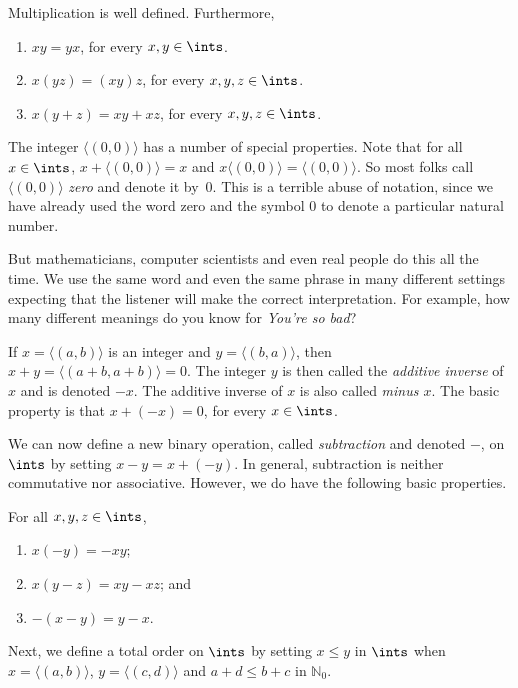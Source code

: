 \begin{theorem}  Multiplication is well defined.  Furthermore,
\begin{enumerate}
\item $xy=yx$,  for every $x,y\in \ints$.
\item $x(yz)=(xy)z$, for every $x,y,z\in \ints$.
\item $x(y+z)=xy+xz$, for every $x,y,z\in \ints$.
\end{enumerate}
\end{theorem}

The integer $\langle(0,0)\rangle$ has a number of special properties. 
Note that for all $x\in\ints$, $x+\langle(0,0)\rangle= x$ 
and $x\langle(0,0)\rangle=\langle(0,0)\rangle$.
So most folks call $\langle(0,0)\rangle$ \textit{zero}
and denote it by~$0$.  This is a terrible abuse of notation, 
since we have already used the word zero and the symbol $0$ to 
denote a particular natural number.

But mathematicians, computer scientists and even
real people do this all the time.  We use the same
word and even the same phrase in many different settings 
expecting that the listener
will make the correct interpretation.  For example, how many
different meanings do you know for \textit{You're so bad}?


If $x=\langle(a,b)\rangle$ is an integer and $y=
\langle(b,a)\rangle$, 
then $x+y=\langle(a+b,a+b)\rangle=0$.  
The integer $y$ is then
called the \textit{additive inverse} of $x$  and is denoted
$-x$.  The additive inverse of $x$ is also called \textit{minus $x$}.
The basic property is that $x + (-x) = 0$, for every $x\in \ints$.

We can now define a new binary operation, called \textit{subtraction}
and denoted $-$, on $\ints$ by
setting $x-y= x+(-y)$.  In general, subtraction is neither
commutative nor associative.  However, we do have the following
basic properties.

\begin{theorem}
For all $x,y,z\in\ints$,
\begin{enumerate}
\item $x(-y)=-xy$;
\item $x(y-z)= xy-xz$; and
\item $-(x-y)=y-x$.
\end{enumerate}
\end{theorem}

Next, we define a total order on $\ints$ by
setting $x\le y$ in $\ints$ when $x=\langle(a,b)\rangle$, $y=\langle(c,d)
\rangle$ and
$a+d \le b+c$ in $\mathbb{N}_0$.

